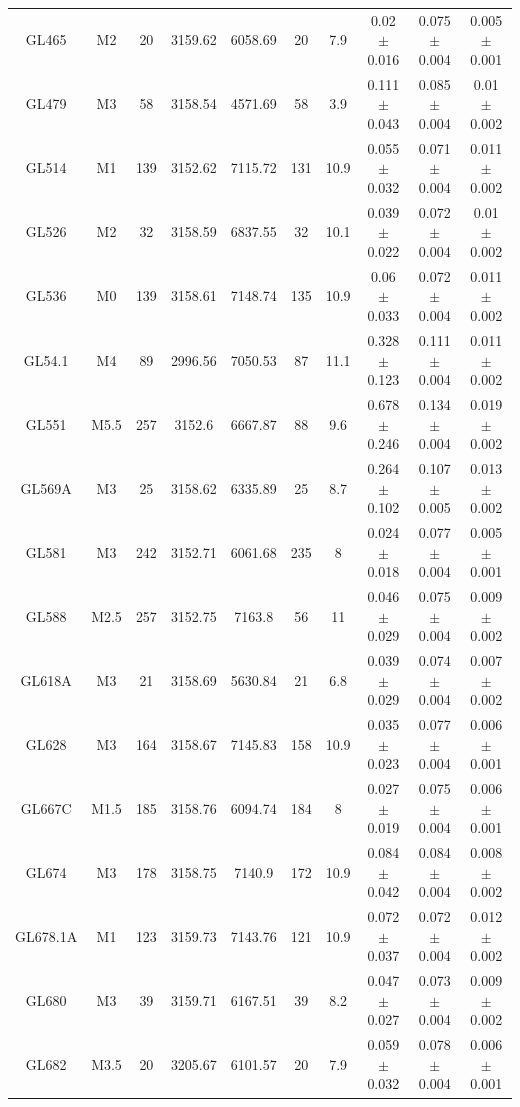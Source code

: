 \begin{landscape}
\begin{longtable}{|c|c|c|c|c|c|c|c|c|c|}
GL465 & M2 & 20 & 3159.62 & 6058.69 & 20 & 7.9 & 0.02 $\pm$ 0.016 & 0.075 $\pm$ 0.004 & 0.005 $\pm$ 0.001\\       
GL479 & M3 & 58 & 3158.54 & 4571.69 & 58 & 3.9 & 0.111 $\pm$ 0.043 & 0.085 $\pm$ 0.004 & 0.01 $\pm$ 0.002\\       
GL514 & M1 & 139 & 3152.62 & 7115.72 & 131 & 10.9 & 0.055 $\pm$ 0.032 & 0.071 $\pm$ 0.004 & 0.011 $\pm$ 0.002\\   
GL526 & M2 & 32 & 3158.59 & 6837.55 & 32 & 10.1 & 0.039 $\pm$ 0.022 & 0.072 $\pm$ 0.004 & 0.01 $\pm$ 0.002\\      
GL536 & M0 & 139 & 3158.61 & 7148.74 & 135 & 10.9 & 0.06 $\pm$ 0.033 & 0.072 $\pm$ 0.004 & 0.011 $\pm$ 0.002\\     
GL54.1 & M4 & 89 & 2996.56 & 7050.53 & 87 & 11.1 & 0.328 $\pm$ 0.123 & 0.111 $\pm$ 0.004 & 0.011 $\pm$ 0.002\\    
GL551 & M5.5 & 257 & 3152.6 & 6667.87 & 88 & 9.6 & 0.678 $\pm$ 0.246 & 0.134 $\pm$ 0.004 & 0.019 $\pm$ 0.002\\    
GL569A & M3 & 25 & 3158.62 & 6335.89 & 25 & 8.7 & 0.264 $\pm$ 0.102 & 0.107 $\pm$ 0.005 & 0.013 $\pm$ 0.002\\     
GL581 & M3 & 242 & 3152.71 & 6061.68 & 235 & 8 & 0.024 $\pm$ 0.018 & 0.077 $\pm$ 0.004 & 0.005 $\pm$ 0.001\\      
GL588 & M2.5 & 257 & 3152.75 & 7163.8 & 56 & 11 & 0.046 $\pm$ 0.029 & 0.075 $\pm$ 0.004 & 0.009 $\pm$ 0.002\\     
GL618A & M3 & 21 & 3158.69 & 5630.84 & 21 & 6.8 & 0.039 $\pm$ 0.029 & 0.074 $\pm$ 0.004 & 0.007 $\pm$ 0.002\\     
GL628 & M3 & 164 & 3158.67 & 7145.83 & 158 & 10.9 & 0.035 $\pm$ 0.023 & 0.077 $\pm$ 0.004 & 0.006 $\pm$ 0.001\\   
GL667C & M1.5 & 185 & 3158.76 & 6094.74 & 184 & 8 & 0.027 $\pm$ 0.019 & 0.075 $\pm$ 0.004 & 0.006 $\pm$ 0.001\\   
GL674 & M3 & 178 & 3158.75 & 7140.9 & 172 & 10.9 & 0.084 $\pm$ 0.042 & 0.084 $\pm$ 0.004 & 0.008 $\pm$ 0.002\\    
GL678.1A & M1 & 123 & 3159.73 & 7143.76 & 121 & 10.9 & 0.072 $\pm$ 0.037 & 0.072 $\pm$ 0.004 & 0.012 $\pm$ 0.002\\
GL680 & M3 & 39 & 3159.71 & 6167.51 & 39 & 8.2 & 0.047 $\pm$ 0.027 & 0.073 $\pm$ 0.004 & 0.009 $\pm$ 0.002\\      
GL682 & M3.5 & 20 & 3205.67 & 6101.57 & 20 & 7.9 & 0.059 $\pm$ 0.032 & 0.078 $\pm$ 0.004 & 0.006 $\pm$ 0.001\\    

\end{longtable}
\end{landscape}
